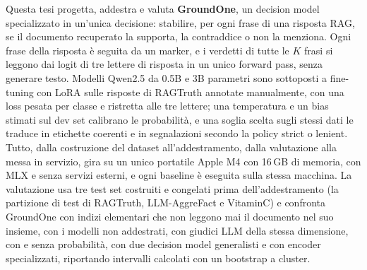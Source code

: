 Questa tesi progetta, addestra e valuta \textbf{GroundOne}, un decision model specializzato in un'unica decisione: stabilire,
per ogni frase di una risposta RAG, se il documento recuperato la supporta, la contraddice o non la menziona. Ogni frase
della risposta è seguita da un marker, e i verdetti di tutte le $K$ frasi si leggono dai logit di tre lettere di risposta
in un unico forward pass, senza generare testo. Modelli Qwen2.5 da 0.5B e 3B parametri sono sottoposti a fine-tuning con
LoRA sulle risposte di RAGTruth annotate manualmente, con una loss pesata per classe e ristretta alle tre lettere; una
temperatura e un bias stimati sul dev set calibrano le probabilità, e una soglia scelta sugli stessi dati le traduce in
etichette coerenti e in segnalazioni secondo la policy strict o lenient. Tutto, dalla costruzione del dataset
all'addestramento, dalla valutazione alla messa in servizio, gira su un unico portatile Apple M4 con 16\,GB di memoria,
con MLX e senza servizi esterni, e ogni baseline è eseguita sulla stessa macchina. La valutazione usa tre test set costruiti e
congelati prima dell'addestramento (la partizione di test di RAGTruth, LLM-AggreFact e VitaminC) e confronta GroundOne con indizi elementari che non leggono mai il documento nel suo insieme, con i modelli non addestrati, con giudici LLM della stessa dimensione, con
e senza probabilità, con due decision model generalisti e con encoder specializzati, riportando intervalli calcolati con un
bootstrap a cluster.

